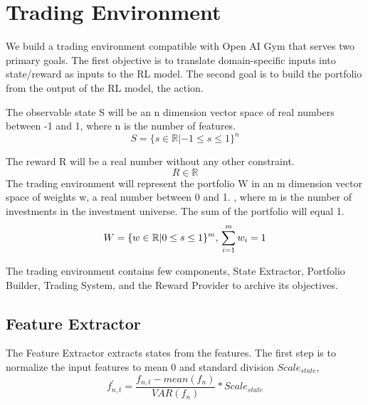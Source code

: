 \section{Trading Environment}
We build a trading environment compatible with Open AI Gym \cite{brockman2016openai} that serves two primary goals. The first objective is to translate domain-specific inputs into state/reward as inputs to the RL model. The second goal is to build the portfolio from the output of the RL model, the action.

\par
The observable state S will be an n dimension vector space of real numbers between -1 and 1, where n is the number of features.
\[
    S = \{ {s \in \mathbb{R} | -1 \leq s \leq 1 } \} ^n
\]

\par
The reward R will be a real number without any other constraint.
\[
    R \in \mathbb{R}
\]
The trading environment will represent the portfolio W in an m dimension vector space of weights w, a real number between 0 and 1. , where m is the number of investments in the investment universe. The sum of the portfolio will equal 1.
\[
    W = \{ {w \in \mathbb{R} | 0 \leq s \leq 1 } \} ^m,
    \\
    \sum_{i=1}^m {w_i} =1
\]
\par
The trading environment contains few components, State Extractor, Portfolio Builder, Trading System, and the Reward Provider to archive its objectives.

\subsection {Feature Extractor}
The Feature Extractor extracts states from the features. 
The first step is to normalize the input features to mean 0 and standard division \(Scale_{state}\),
\[
    f^{'}_{n,t} = \frac{f_{n,t} -  mean(f_n)}{VAR(f_n)}*Scale_{state} 
\]

